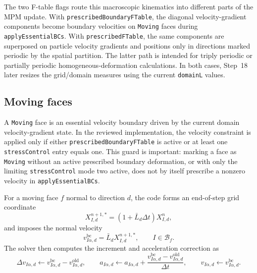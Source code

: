 The two F-table flags route this macroscopic kinematics into different parts of the MPM update.  With \texttt{prescribedBoundaryFTable}, the diagonal velocity-gradient components become boundary velocities on \texttt{Moving} faces during \texttt{applyEssentialBCs}.  With \texttt{prescribedFTable}, the same components are superposed on particle velocity gradients and positions only in directions marked periodic by the spatial partition.  The latter path is intended for triply periodic or partially periodic homogeneous-deformation calculations.  In both cases, Step~18 later resizes the grid/domain measures using the current \texttt{domainL} values.

\subsection{Moving faces}
\label{subsec:bc-moving}

A \texttt{Moving} face is an essential velocity boundary driven by the current domain velocity-gradient state.  In the reviewed implementation, the velocity constraint is applied only if either \texttt{prescribedBoundaryFTable} is active or at least one \texttt{stressControl} entry equals one.  This guard is important: marking a face as \texttt{Moving} without an active prescribed boundary deformation, or with only the limiting \texttt{stressControl} mode two active, does not by itself prescribe a nonzero velocity in \texttt{applyEssentialBCs}.

For a moving face $f$ normal to direction $d$, the code forms an end-of-step grid coordinate
\begin{equation}
  X_{I,d}^{n+1,*}=\left(1+\bar L_d\Delta t\right)X_{I,d}^{n},
\end{equation}
and imposes the normal velocity
\begin{equation}
  v_{I\alpha,d}^{\mathrm{bc}} = \bar L_d X_{I,d}^{n+1,*},
  \qquad I\in\mathcal{B}_f.
  \label{eq:bc-moving-normal-velocity}
\end{equation}
The solver then computes the increment and acceleration correction as
\begin{equation}
  \Delta v_{I\alpha,d} \leftarrow v_{I\alpha,d}^{\mathrm{bc}}-v_{I\alpha,d}^{\mathrm{old}},
  \qquad
  a_{I\alpha,d} \leftarrow a_{I\alpha,d}+\frac{v_{I\alpha,d}^{\mathrm{bc}}-v_{I\alpha,d}^{\mathrm{old}}}{\Delta t},
  \qquad
  v_{I\alpha,d}\leftarrow v_{I\alpha,d}^{\mathrm{bc}}.
  \label{eq:bc-moving-normal-correction}
\end{equation}

